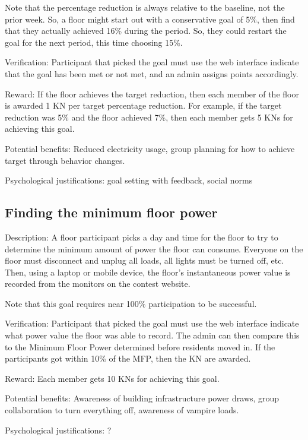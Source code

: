 Note that the percentage reduction is always relative to the baseline, not the prior week.  So, a floor might start out with a conservative goal of 5\%, then find that they actually achieved 16\% during the period. So, they could restart the goal for the next period, this time choosing 15\%.

Verification: Participant that picked the goal must use the web interface indicate that the goal has been met or not met, and an admin assigns points accordingly.

Reward: If the floor achieves the target reduction, then each member of the floor is awarded 1 KN per target percentage reduction. For example, if the target reduction was 5\% and the floor achieved 7\%, then each member gets 5 KNs for achieving this goal.

Potential benefits: Reduced electricity usage, group planning for how to achieve target through behavior changes.

Psychological justifications: goal setting with feedback, social norms

\subsection{Finding the minimum floor power}
\label{sec:goal-minimum-energy}

Description: A floor participant picks a day and time for the floor to try to determine the minimum amount of power the floor can consume. Everyone on the floor must disconnect and unplug all loads, all lights must be turned off, etc. Then, using a laptop or mobile device, the floor's instantaneous power value is recorded from the monitors on the contest website.

Note that this goal requires near 100\% participation to be successful.

Verification: Participant that picked the goal must use the web interface indicate what power value the floor was able to record. The admin can then compare this to the Minimum Floor Power determined before residents moved in. If the participants got within 10\% of the MFP, then the KN are awarded.

Reward: Each member gets 10 KNs for achieving this goal.

Potential benefits: Awareness of building infrastructure power draws, group collaboration to turn everything off, awareness of vampire loads.

Psychological justifications: ?
